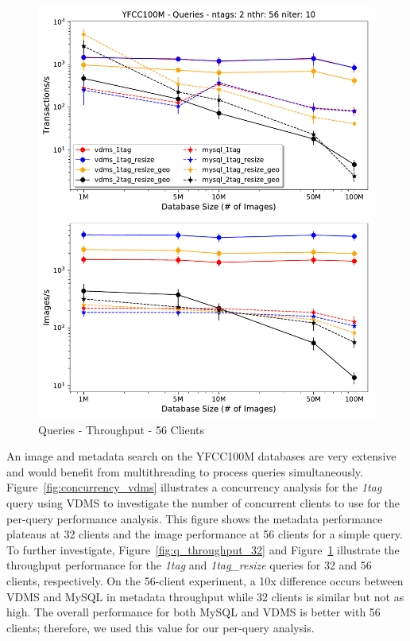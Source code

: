 \begin{figure}[t!]
\centering
\includegraphics[width=\columnwidth]{figures/queries_throughput_56}
\caption{Queries - Throughput - 56 Clients}
\label{fig:q_throughput_56}
\end{figure}

An image and metadata search on the YFCC100M databases are very extensive
and would benefit from multithreading to process queries simultaneously.
Figure~\ref{fig:concurrency_vdms} illustrates a concurrency analysis for
the \textit{1tag} query using VDMS to investigate the number of
concurrent clients to use for the per-query performance analysis.
This figure shows the metadata performance plateaus at 32 clients and
the image performance at 56 clients for a simple query.
To further investigate, Figure~\ref{fig:q_throughput_32} and
Figure~\ref{fig:q_throughput_56} illustrate the throughput performance
for the \textit{1tag} and \textit{1tag\_resize} queries for 32 and 56 clients,
respectively.
On the 56-client experiment, a 10x difference occurs between VDMS and
MySQL in metadata throughput while 32 clients is similar but not as high.
The overall performance for both MySQL and VDMS is better with 56 clients;
therefore, we used this value for our per-query analysis.

